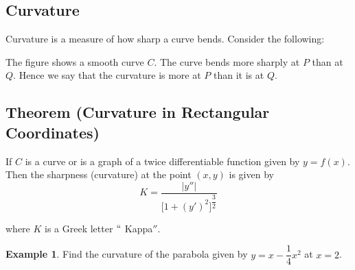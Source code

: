 \documentclass[11pt,a4paper]{article}
\theoremstyle{definition}
\newtheorem{exa}[thm]{Example}
\begin{document}
\subsection{Curvature}
Curvature is a measure of how sharp a curve bends. Consider the following:


\begin{figure}[H]
\centering
{}
\end{figure}

The figure shows a smooth curve $C$. The curve bends more sharply at $P$ than at $Q$. Hence we say that the curvature is more at $P$ than it is at $Q$.


\subsection{Theorem (Curvature in Rectangular Coordinates)}
If $C$ is a curve or is a graph of a twice differentiable function given by $y = f(x)$. Then the sharpness (curvature) at the point $(x,y)$ is given by $$K  = \dfrac{\left|y''\right|
}{\Big[ 1 + (y')^2\Big]^{\dfrac{3}{2}}}$$

where $K$ is a Greek letter $``$ Kappa$''$.


\begin{exa}


Find the curvature of the parabola given by $y = x - \dfrac{1}{4}x^2$ at $x = 2$.
\end{exa}
\end{document}
